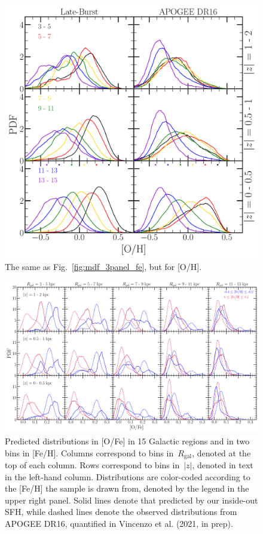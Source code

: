 \documentclass[a4paper, fleqn, usenatbib, useAMS]{mnras}
\begin{document}
\begin{figure} 
\centering 
\includegraphics[scale = 0.34]{mdf_3panel_lateburst_O.pdf} 
\caption{The same as Fig.~\ref{fig:mdf_3panel_fe}, but for [O/H].} 
\label{fig:mdf_3panel_o} 
\end{figure} 

\begin{figure} 
\centering 
\includegraphics[scale = 0.32]{ofe_mdfs_insideout.pdf} 
\caption{Predicted distributions in [O/Fe] in 15 Galactic regions and in two 
bins in [Fe/H]. Columns correspond to bins in~$R_\text{gal}$, denoted at the 
top of each column. Rows correspond to bins in~$\left|z\right|$, denoted in 
text in the left-hand column. Distributions are color-coded according to the 
[Fe/H] the sample is drawn from, denoted by the legend in the upper right 
panel. Solid lines denote that predicted by our inside-out SFH, while dashed 
lines denote the observed distributions from APOGEE DR16, quantified in 
Vincenzo et al. (2021, in prep). 
\label{fig:ofe_mdfs_insideout} 
}
\end{figure} 
\end{document}
